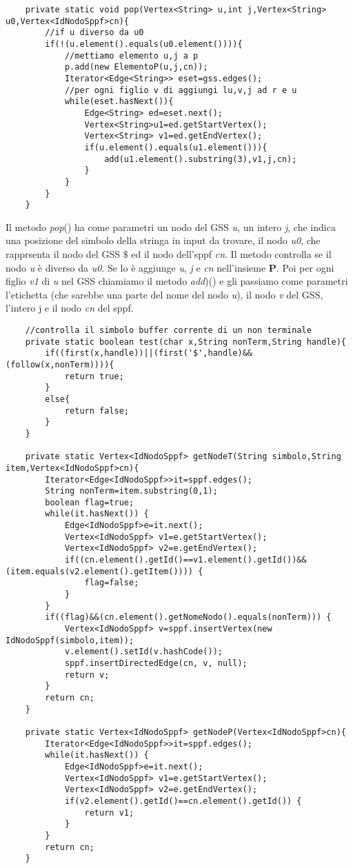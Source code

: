 \begin{lstlisting}
	private static void pop(Vertex<String> u,int j,Vertex<String> u0,Vertex<IdNodoSppf>cn){
		//if u diverso da u0
		if(!(u.element().equals(u0.element()))){
			//mettiamo elemento u,j a p
			p.add(new ElementoP(u,j,cn));
			Iterator<Edge<String>> eset=gss.edges();
			//per ogni figlio v di aggiungi lu,v,j ad r e u
			while(eset.hasNext()){
				Edge<String> ed=eset.next();
				Vertex<String>u1=ed.getStartVertex();
				Vertex<String> v1=ed.getEndVertex();
				if(u.element().equals(u1.element())){
					add(u1.element().substring(3),v1,j,cn);
				}
			}
		}
	}
\end{lstlisting}
Il metodo \textit{pop}() ha come parametri un nodo del GSS \textit{u}, un intero \textit{j}, che indica una posizione del simbolo della stringa in input da trovare, il nodo \textit{u0}, che rapprsenta il nodo del GSS $\$$ ed il nodo dell'sppf \textit{cn}. Il metodo controlla se il nodo \textit{u} è diverso da \textit{u0}. Se lo è aggiunge \textit{u}, \textit{j} e \textit{cn} nell'insieme \textbf{P}. Poi per ogni figlio \textit{v1} di \textit{u} nel GSS chiamiamo il metodo \textit{add})() e gli passiamo come parametri l'etichetta (che sarebbe una parte del nome del nodo \textit{u}), il nodo \textit{v} del GSS, l'intero j e il nodo \textit{cn}  del sppf.
\begin{lstlisting}
	//controlla il simbolo buffer corrente di un non terminale 
	private static boolean test(char x,String nonTerm,String handle){
		if((first(x,handle))||(first('$',handle)&&(follow(x,nonTerm)))){
			return true;
		}
		else{
			return false;
		}
	}
	
	private static Vertex<IdNodoSppf> getNodeT(String simbolo,String item,Vertex<IdNodoSppf>cn){
		Iterator<Edge<IdNodoSppf>>it=sppf.edges();
		String nonTerm=item.substring(0,1);
		boolean flag=true;
		while(it.hasNext()) {
			Edge<IdNodoSppf>e=it.next();
			Vertex<IdNodoSppf> v1=e.getStartVertex();
			Vertex<IdNodoSppf> v2=e.getEndVertex();
			if((cn.element().getId()==v1.element().getId())&&(item.equals(v2.element().getItem()))) {
				flag=false;
			}
		}
		if((flag)&&(cn.element().getNomeNodo().equals(nonTerm))) {
			Vertex<IdNodoSppf> v=sppf.insertVertex(new IdNodoSppf(simbolo,item));
			v.element().setId(v.hashCode());
			sppf.insertDirectedEdge(cn, v, null);
			return v;
		}
		return cn;
	}
	
	private static Vertex<IdNodoSppf> getNodeP(Vertex<IdNodoSppf>cn){
		Iterator<Edge<IdNodoSppf>>it=sppf.edges();
		while(it.hasNext()) {
			Edge<IdNodoSppf>e=it.next();
			Vertex<IdNodoSppf> v1=e.getStartVertex();
			Vertex<IdNodoSppf> v2=e.getEndVertex();
			if(v2.element().getId()==cn.element().getId()) {
				return v1;
			}
		}
		return cn;
	}
	
\end{lstlisting}
